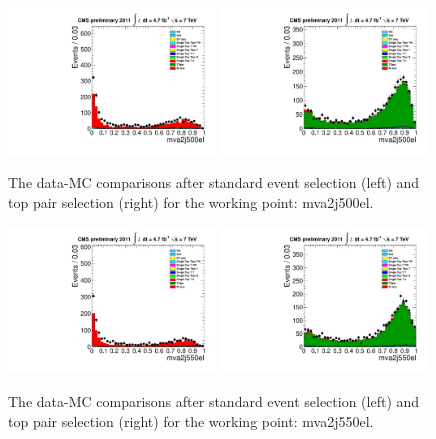 \begin{figure}[!t]
  \centering
  \includegraphics[width=0.49\textwidth]{figs/cl-mva2j500el-normal.pdf}
  \includegraphics[width=0.49\textwidth]{figs/cl-mva2j500el-inTTbar.pdf}
  \caption{\label{fig:mva:plots-mva2j500el} The data-MC comparisons
    after standard event selection (left) and top pair
    selection (right) for the working point: mva2j500el.}
\end{figure}

\begin{figure}[!t]
  \centering
  \includegraphics[width=0.49\textwidth]{figs/cl-mva2j550el-normal.pdf}
  \includegraphics[width=0.49\textwidth]{figs/cl-mva2j550el-inTTbar.pdf}
  \caption{\label{fig:mva:plots-mva2j550el} The data-MC comparisons
    after standard event selection (left) and top pair
    selection (right) for the working point: mva2j550el.}
\end{figure}

